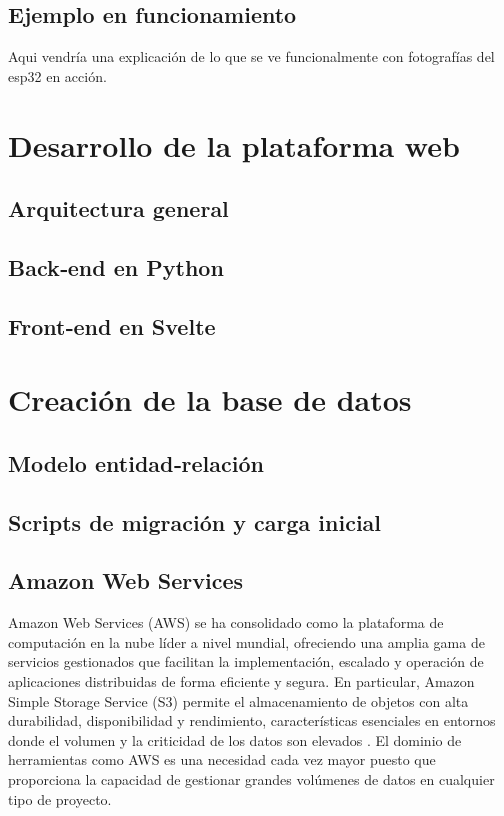 \documentclass[12pt, a4paper]{article}
\begin{document}
	 
	
	\subsection{Ejemplo en funcionamiento}
	
	Aqui vendría una explicación de lo que se ve funcionalmente con fotografías del esp32 en acción.

\section{Desarrollo de la plataforma web}
	\subsection{Arquitectura general}
	\subsection{Back‑end en Python}
	\subsection{Front‑end en Svelte}

\section{Creación de la base de datos}
	\subsection{Modelo entidad‑relación}
	\subsection{Scripts de migración y carga inicial}
	
	\subsection{Amazon Web Services}
	
	Amazon Web Services (AWS) se ha consolidado como la plataforma de computación en la nube líder a nivel mundial, ofreciendo una amplia gama de servicios gestionados que facilitan la implementación, escalado y operación de aplicaciones distribuidas de forma eficiente y segura. En particular, Amazon Simple Storage Service (S3) permite el almacenamiento de objetos con alta durabilidad, disponibilidad y rendimiento, características esenciales en entornos donde el volumen y la criticidad de los datos son elevados \cite{awss3}. El dominio de herramientas como AWS es una necesidad cada vez mayor puesto que proporciona la capacidad de gestionar grandes volúmenes de datos en cualquier tipo de proyecto.
	
\end{document}
